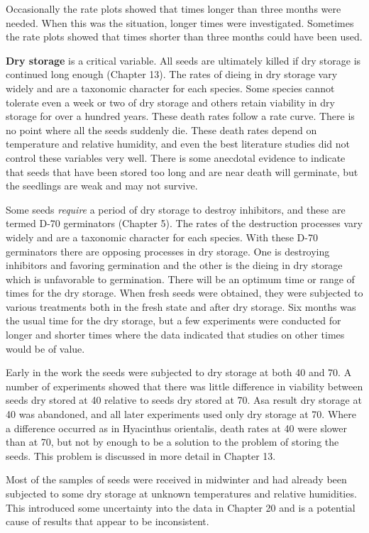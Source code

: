 Occasionally the rate plots showed that times longer than three months were
needed. When this was the situation, longer times were investigated. Sometimes the
rate plots showed that times shorter than three months could have been used.

\textbf{Dry storage} is a critical variable. All seeds are ultimately killed if dry storage
is continued long enough (Chapter 13). The rates of dieing in dry storage vary widely
and are a taxonomic character for each species. Some species cannot tolerate even a
week or two of dry storage and others retain viability in dry storage for over a hundred
years. These death rates follow a rate curve. There is no point where all the seeds
suddenly die. These death rates depend on temperature and relative humidity, and
even the best literature studies did not control these variables very well. There is
some anecdotal evidence to indicate that seeds that have been stored too long and
are near death will germinate, but the seedlings are weak and may not survive.

Some seeds \textit{require} a period of dry storage to destroy inhibitors, and these are
termed D-70 germinators (Chapter 5). The rates of the destruction processes vary
widely and are a taxonomic character for each species. With these D-70 germinators
there are opposing processes in dry storage. One is destroying inhibitors and favoring
germination and the other is the dieing in dry storage which is unfavorable to
germination. There will be an optimum time or range of times for the dry storage.
When fresh seeds were obtained, they were subjected to various treatments
both in the fresh state and after dry storage. Six months was the usual time for the dry
storage, but a few experiments were conducted for longer and shorter times where the
data indicated that studies on other times would be of value.

Early in the work the seeds were subjected to dry storage at both 40 and 70. A
number of experiments showed that there was little difference in viability between
seeds dry stored at 40 relative to seeds dry stored at 70. Asa result dry storage at 40
was abandoned, and all later experiments used only dry storage at 70. Where a
difference occurred as in Hyacinthus orientalis, death rates at 40 were slower than at
70, but not by enough to be a solution to the problem of storing the seeds. This
problem is discussed in more detail in Chapter 13.

Most of the samples of seeds were received in midwinter and had already been
subjected to some dry storage at unknown temperatures and relative humidities. This
introduced some uncertainty into the data in Chapter 20 and is a potential cause of
results that appear to be inconsistent.

